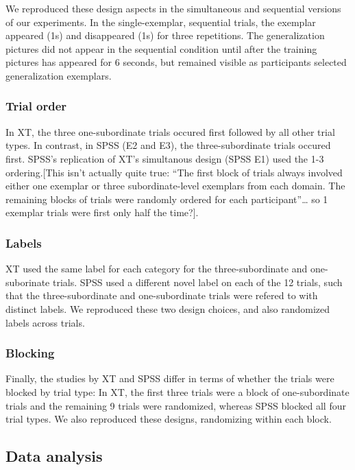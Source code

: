 \documentclass[english,floatsintext,man]{apa6}
\theoremstyle{definition}
\theoremstyle{definition}
\theoremstyle{remark}
\begin{document}
We reproduced these design aspects in the simultaneous and sequential
versions of our experiments. In the single-exemplar, sequential trials,
the exemplar appeared (1s) and disappeared (1s) for three repetitions.
The generalization pictures did not appear in the sequential condition
until after the training pictures has appeared for 6 seconds, but
remained visible as participants selected generalization exemplars.

\subsubsection{Trial order}\label{trial-order}

In XT, the three one-subordinate trials occured first followed by all
other trial types. In contrast, in SPSS (E2 and E3), the
three-subordinate trials occured first. SPSS's replication of XT's
simultanous design (SPSS E1) used the 1-3 ordering.{[}This isn't
actually quite true: \enquote{The first block of trials always involved
either one exemplar or three subordinate-level exemplars from each
domain. The remaining blocks of trials were randomly ordered for each
participant}\ldots{} so 1 exemplar trials were first only half the
time?{]}.

\subsubsection{Labels}\label{labels}

XT used the same label for each category for the three-subordinate and
one-suborinate trials. SPSS used a different novel label on each of the
12 trials, such that the three-subordinate and one-subordinate trials
were refered to with distinct labels. We reproduced these two design
choices, and also randomized labels across trials.

\subsubsection{Blocking}\label{blocking}

Finally, the studies by XT and SPSS differ in terms of whether the
trials were blocked by trial type: In XT, the first three trials were a
block of one-subordinate trials and the remaining 9 trials were
randomized, whereas SPSS blocked all four trial types. We also
reproduced these designs, randomizing within each block.

\subsection{Data analysis}\label{data-analysis}
\end{document}
